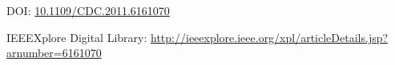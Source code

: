 \documentclass[a4paper,12pt]{article}
\newcommand{\doi}[1]{DOI: \href{http://dx.doi.org/#1}{#1}}
\begin{document}
\thispagestyle{empty}

\vspace{3cm}

\nocite{FDB-c-18}
\printbibliography

\vspace{3cm}
\doi{10.1109/CDC.2011.6161070}

\vspace{1.5cm}
IEEEXplore Digital Library:
\url{http://ieeexplore.ieee.org/xpl/articleDetails.jsp?arnumber=6161070}

\newpage

\end{document}
